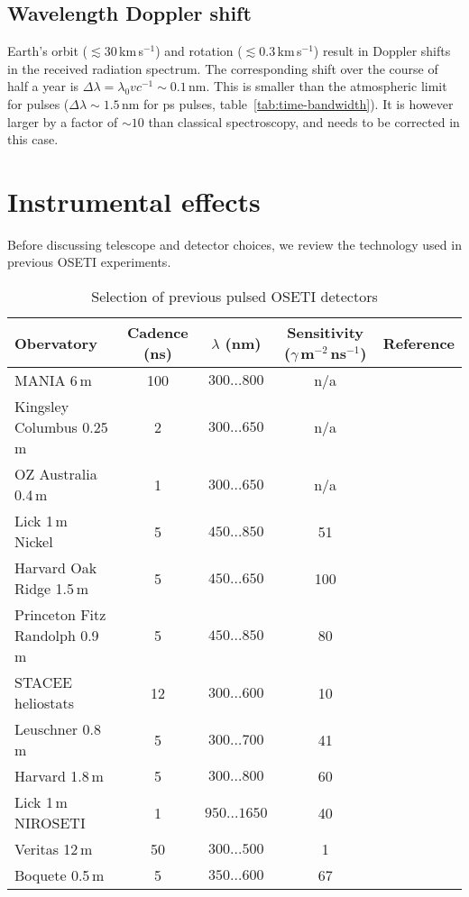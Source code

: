 \documentclass[twocolumn,tighten,longauthor]{myaastex62}
\begin{document}
\subsection{Wavelength Doppler shift}
\label{sub:doppler}
Earth's orbit ($\lesssim30\,$km\,s$^{-1}$) and rotation ($\lesssim0.3\,$km\,s$^{-1}$) result in Doppler shifts in the received radiation spectrum. The corresponding shift over the course of half a year is $\Delta \lambda =\lambda_0 vc^{-1}\sim0.1\,$nm. This is smaller than the atmospheric limit for pulses ($\Delta \lambda \sim 1.5\,$nm for ps pulses, table~\ref{tab:time-bandwidth}). It is however larger by a factor of $\sim10$ than classical spectroscopy, and needs to be corrected in this case.


\section{Instrumental effects}
Before discussing telescope and detector choices, we review the technology used in previous OSETI experiments.


\begin{table*}
\center
\caption{Selection of previous pulsed OSETI detectors}
\label{tab:previous_obs}
\begin{tabular}{lcccr}
\hline
Obervatory & Cadence (ns) & $\lambda$ (nm) & Sensitivity ($\gamma$\,m$^{-2}\,$ns$^{-1}$) & Reference \\
\hline
MANIA 6\,m                     & 100 & $300\dots800$ & n/a & \citet{1993ASPC...47..381S} \\
Kingsley Columbus 0.25\,m      & 2  & $300\dots650$  & n/a & \citet{1995ASPC...74..387K} \\
OZ Australia 0.4\,m            & 1  & $300\dots650$  & n/a & \citet{2000ASPC..213..553B,2001SPIE.4273..144B} \\
Lick 1\,m Nickel               & 5  & $450\dots850$  & 51  & \citet{2001SPIE.4273..173W} \\
Harvard Oak Ridge 1.5\,m       & 5  & $450\dots650$  & 100 & \citet{2004ApJ...613.1270H} \\
Princeton Fitz Randolph 0.9\,m & 5  & $450\dots850$  & 80  & \citet{2004ApJ...613.1270H} \\
STACEE heliostats              & 12 & $300\dots600$  & 10  & \citet{2009AsBio...9..345H} \\
Leuschner 0.8\,m               & 5  & $300\dots700$  & 41  & \citet{2011SPIE.8152E..12K} \\
Harvard 1.8\,m                 & 5  & $300\dots800$  & 60  & \citet{2013PhDT.......161M} \\
Lick 1\,m NIROSETI             & 1  & $950\dots1650$ & 40  & \citet{2014SPIE.9147E..4KM} \\
Veritas 12\,m                  & 50 & $300\dots500$  & 1   & \citet{2016ApJ...818L..33A} \\
Boquete 0.5\,m                 & 5  & $350\dots600$  & 67  & \citet{2016ApJ...825L...5S} \\
\hline
\end{tabular}
\end{table*}
\end{document}
